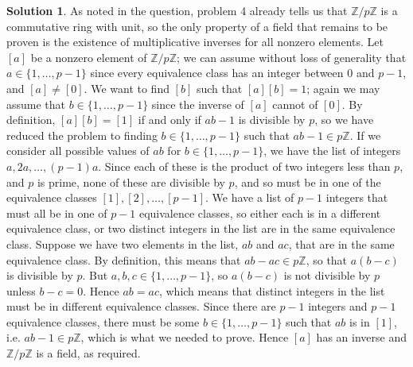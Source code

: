 \documentclass[12pt]{article}
\theoremstyle{definition}
\theoremstyle{definition}
\newtheorem*{soln}{Solution}
\newcommand{\Z}{\mathbb{Z}}
\begin{document}
\begin{soln}
As noted in the question, problem 4 already tells us that $\Z/p\Z$ is a commutative ring with unit, so the only property of a field that remains to be proven is the existence of multiplicative inverses for all nonzero elements. Let $[a]$ be a nonzero element of $\Z/p\Z$; we can assume without loss of generality that $a\in\{1,\dots,p-1\}$ since every equivalence class has an integer between $0$ and $p-1$, and $[a]\neq [0]$. We want to find $[b]$ such that $[a][b]=1$; again we may assume that $b\in\{1,\dots,p-1\}$ since the inverse of $[a]$ cannot of $[0]$. By definition, $[a][b]=[1]$ if and only if $ab-1$ is divisible by $p$, so we have reduced the problem to finding $b\in\{1,\dots,p-1\}$ such that $ab-1\in p\Z$. If we consider all possible values of $ab$ for $b\in\{1,\dots,p-1\}$, we have the list of integers $a,2a,\ldots,(p-1)a$. Since each of these is the product of two integers less than $p$, and $p$ is prime, none of these are divisible by $p$, and so must be in one of the equivalence classes $[1],[2],\dots,[p-1]$. We have a list of $p-1$ integers that must all be in one of $p-1$ equivalence classes, so either each is in a different equivalence class, or two distinct integers in the list are in the same equivalence class. Suppose we have two elements in the list, $ab$ and $ac$, that are in the same equivalence class. By definition, this means that $ab-ac\in p\Z$, so that $a(b-c)$ is divisible by $p$. But $a,b,c\in\{1,\dots,p-1\}$, so $a(b-c)$ is not divisible by $p$ unless $b-c=0$. Hence $ab=ac$, which means that distinct integers in the list must be in different equivalence classes. Since there are $p-1$ integers and $p-1$ equivalence classes, there must be some $b\in\{1,\dots,p-1\}$ such that $ab$ is in $[1]$, i.e. $ab-1\in p\Z$, which is what we needed to prove. Hence $[a]$ has an inverse and $\Z/p\Z$ is a field, as required.
\end{soln}
\end{document}
